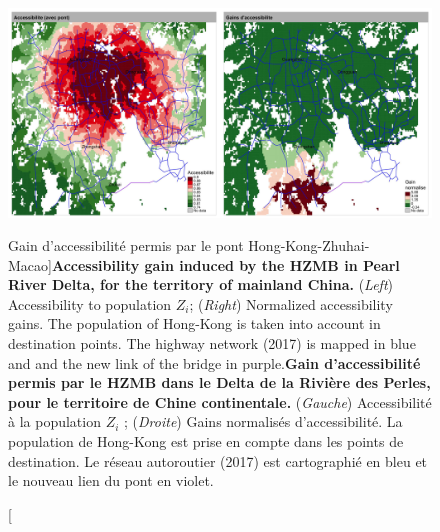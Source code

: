 \begin{figure}
	\includegraphics[width=\linewidth]{Figures/Final/1-2-1-fig-casestudies-prd.jpg}
	\caption[Accessibility gain induced by the Hong-Kong-Zhuhai-Macao gain][Gain d'accessibilité permis par le pont Hong-Kong-Zhuhai-Macao]{\textbf{Accessibility gain induced by the HZMB in Pearl River Delta, for the territory of mainland China.} (\textit{Left}) Accessibility to population $Z_i$; (\textit{Right}) Normalized accessibility gains. The population of Hong-Kong is taken into account in destination points. The highway network (2017) is mapped in blue and and the new link of the bridge in purple.\label{fig:casestudies:prd}}{\textbf{Gain d'accessibilité permis par le HZMB dans le Delta de la Rivière des Perles, pour le territoire de Chine continentale.} (\textit{Gauche}) Accessibilité à la population $Z_i$ ; (\textit{Droite}) Gains normalisés d'accessibilité. La population de Hong-Kong est prise en compte dans les points de destination. Le réseau autoroutier (2017) est cartographié en bleu et le nouveau lien du pont en violet.\label{fig:casestudies:prd}}
\end{figure}


